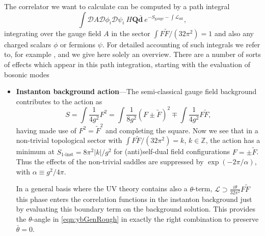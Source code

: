 \documentclass[11pt,a4paper]{article}
\begin{document}
The correlator we want to calculate can be computed by a path integral 
\begin{equation}
    \int \mathcal{D}A \mathcal{D} \phi_i \mathcal{D}\psi_i \ H \mathbf{Q} \mathbf{\bar d} \ e^{-S_\text{gauge} - \int \mathcal{L}_\text{int}},
\end{equation}
%
integrating over the gauge field $A$ in the sector $\int F \tilde{F} /(32 \pi^2) = 1$ and also any charged scalars $\phi$ or fermions $\psi$. For detailed accounting of such integrals we refer to, for example \cite{Csaki:2019vte,Vandoren:2008xg,Morrissey:2005uza,Ringwald:1989ee,Espinosa:1989qn}, and we give here solely an overview. There are a number of sorts of effects which appear in this path integration, starting with the evaluation of bosonic modes
\begin{itemize}
    \item \textbf{Instanton background action}---The semi-classical gauge field background contributes to the action as
    \begin{equation}
        S = \int \frac{1}{4g^2} F^2 = \int \frac{1}{8g^2} ( F \pm \tilde{F})^2 \mp \int \frac{1}{4g^2} F \tilde{F},
    \end{equation}
    having made use of $F^2 = \tilde{F}^2$ and completing the square. Now we see that in a non-trivial topological sector with $\int F \tilde{F} /(32 \pi^2) = k$, $k \in \mathbb{Z}$, the action has a minimum at $S_{\text{1-inst}}=8\pi^2 |k|/g^2$ for (anti)self-dual field configurations $F = \pm \tilde{F}$. Thus the effects of the non-trivial saddles are suppressed by $\exp(-2\pi/\alpha)$, with $\alpha \equiv g^2/4\pi$.

    In a general basis where the UV theory contains also a $\theta$-term, $\mathcal{L} \supset \frac{i \theta}{32\pi^2} F \tilde{F}$ this phase enters the correlation functions in the instanton background just by evaluating this boundary term on the background solution. This provides the $\theta$-angle in \eqref{eqn:ybGenRough} in exactly the right combination to preserve $\bar \theta = 0$.
    

\end{itemize}
\end{document}
